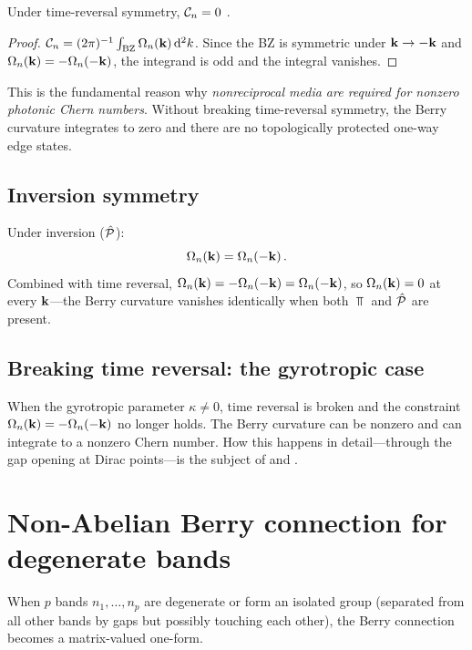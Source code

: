 \begin{corollary}
  Under time-reversal symmetry, $\mathcal{C}_n=0$
\cite{kane2005cond}.
\end{corollary}

\begin{proof}
$\mathcal{C}_n=(2\pi)^{-1}\int_{\mathrm{BZ}}\Omega_n(\mathbf{k})\,\mathrm{d}^2k$.
Since the BZ is symmetric under $\mathbf{k}\to-\mathbf{k}$ and
$\Omega_n(\mathbf{k})=-\Omega_n(-\mathbf{k})$, the integrand is odd and the
integral vanishes.
\end{proof}

This is the fundamental reason why \emph{nonreciprocal media are
required for nonzero photonic Chern numbers}.  Without breaking
time-reversal symmetry, the Berry curvature integrates to zero and
there are no topologically protected one-way edge states.

\subsection{Inversion symmetry}
\label{sec:ch5-inversion}

Under inversion ($\hat{\mathcal{P}}$):
\begin{equation}\label{eq:ch5-inv-curvature}
  \Omega_n(\mathbf{k}) = \Omega_n(-\mathbf{k})\,.
\end{equation}
Combined with time reversal, $\Omega_n(\mathbf{k})=-\Omega_n(-\mathbf{k})
=\Omega_n(-\mathbf{k})$, so $\Omega_n(\mathbf{k})=0$ at every $\mathbf{k}$---the
Berry curvature vanishes identically when both $\Top$ and $\hat{\mathcal{P}}$ are
present.

\subsection{Breaking time reversal: the gyrotropic case}
\label{sec:ch5-breaking-tr}

When the gyrotropic parameter $\kappa\neq 0$, time reversal is broken
and the constraint $\Omega_n(\mathbf{k})=-\Omega_n(-\mathbf{k})$ no longer holds.
The Berry curvature can be nonzero and can integrate to a nonzero
Chern number.  How this happens in detail---through the gap opening at
Dirac points---is the subject of  and
.

\section{Non-Abelian Berry connection for degenerate bands}
\label{sec:ch5-non-abelian}

When $p$ bands $n_1,\ldots,n_p$ are degenerate or form an isolated
group (separated from all other bands by gaps but possibly touching
each other), the Berry connection becomes a matrix-valued one-form.


